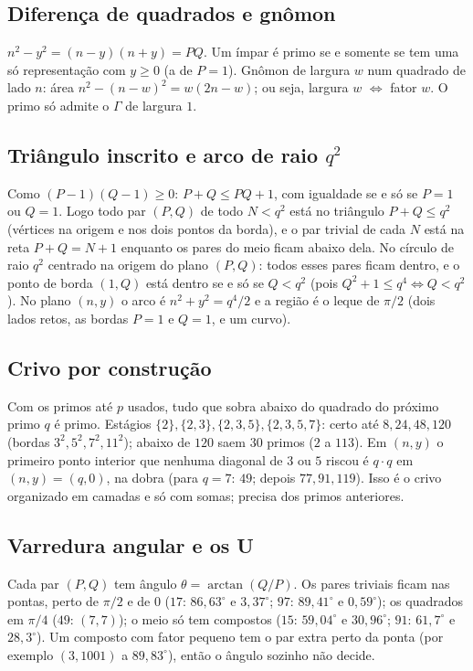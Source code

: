 \documentclass[11pt,a4paper]{article}
\begin{document}
\subsection{Diferença de quadrados e gnômon}
$n^2-y^2=(n-y)(n+y)=PQ$. Um ímpar é primo se e somente se tem uma só representação com $y\ge0$ (a de $P=1$). Gnômon de largura $w$ num quadrado de lado $n$: área $n^2-(n-w)^2=w(2n-w)$; ou seja, largura $w$ $\Leftrightarrow$ fator $w$. O primo só admite o $\Gamma$ de largura $1$.

\subsection{Triângulo inscrito e arco de raio $q^2$}
Como $(P-1)(Q-1)\ge0$: $P+Q\le PQ+1$, com igualdade se e só se $P=1$ ou $Q=1$. Logo todo par $(P,Q)$ de todo $N<q^2$ está no triângulo $P+Q\le q^2$ (vértices na origem e nos dois pontos da borda), e o par trivial de cada $N$ está na reta $P+Q=N+1$ enquanto os pares do meio ficam abaixo dela. No círculo de raio $q^2$ centrado na origem do plano $(P,Q)$: todos esses pares ficam dentro, e o ponto de borda $(1,Q)$ está dentro se e só se $Q<q^2$ (pois $Q^2+1\le q^4\iff Q<q^2$). No plano $(n,y)$ o arco é $n^2+y^2=q^4/2$ e a região é o leque de $\pi/2$ (dois lados retos, as bordas $P=1$ e $Q=1$, e um curvo).

\subsection{Crivo por construção}
Com os primos até $p$ usados, tudo que sobra abaixo do quadrado do próximo primo $q$ é primo. Estágios $\{2\},\{2,3\},\{2,3,5\},\{2,3,5,7\}$: certo até $8,24,48,120$ (bordas $3^2,5^2,7^2,11^2$); abaixo de $120$ saem $30$ primos ($2$ a $113$). Em $(n,y)$ o primeiro ponto interior que nenhuma diagonal de $3$ ou $5$ riscou é $q\cdot q$ em $(n,y)=(q,0)$, na dobra (para $q=7$: $49$; depois $77,91,119$). Isso é o crivo organizado em camadas e só com somas; precisa dos primos anteriores.

\subsection{Varredura angular e os U}
Cada par $(P,Q)$ tem ângulo $\theta=\arctan(Q/P)$. Os pares triviais ficam nas pontas, perto de $\pi/2$ e de $0$ ($17$: $86{,}63^\circ$ e $3{,}37^\circ$; $97$: $89{,}41^\circ$ e $0{,}59^\circ$); os quadrados em $\pi/4$ ($49$: $(7,7)$); o meio só tem compostos ($15$: $59{,}04^\circ$ e $30{,}96^\circ$; $91$: $61{,}7^\circ$ e $28{,}3^\circ$). Um composto com fator pequeno tem o par extra perto da ponta (por exemplo $(3,1001)$ a $89{,}83^\circ$), então o ângulo sozinho não decide.
\end{document}
